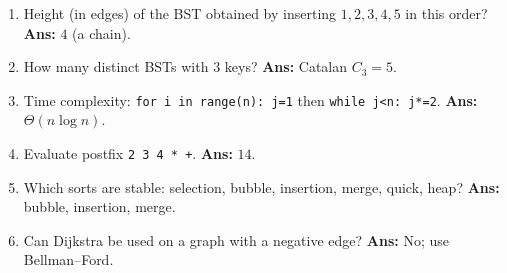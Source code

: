 \documentclass[11pt,a4paper]{article}
\newcommand{\py}[1]{\texttt{#1}}
\begin{document}
\begin{enumerate}[leftmargin=*,itemsep=4pt]
\item Height (in edges) of the BST obtained by inserting $1,2,3,4,5$ in this order? \hfill \textbf{Ans: } $4$ (a chain).
\item How many distinct BSTs with $3$ keys? \hfill \textbf{Ans: } Catalan $C_3=5$.
\item Time complexity: \py{for i in range(n): j=1} then \py{while j<n: j*=2}. \hfill \textbf{Ans: } $\Theta(n\log n)$.
\item Evaluate postfix \py{2 3 4 * +}. \hfill \textbf{Ans: } $14$.
\item Which sorts are stable: selection, bubble, insertion, merge, quick, heap? \hfill \textbf{Ans: } bubble, insertion, merge.
\item Can Dijkstra be used on a graph with a negative edge? \hfill \textbf{Ans: } No; use Bellman--Ford.
\end{enumerate}

\vspace{1em}
\end{document}
